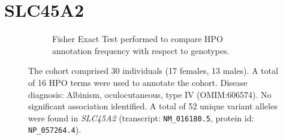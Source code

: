 \section*{SLC45A2}

\begin{figure}[htbp]
\centering
\begin{subfigure}[b]{0.95\textwidth}
\centering
{}
\captionsetup{justification=raggedright,singlelinecheck=false}
\caption{Fisher Exact Test performed to compare HPO annotation frequency with respect to genotypes. }
\end{subfigure}

\vspace{2em}

\caption{ The cohort comprised 30 individuals (17 females, 13 males). A total of 16 HPO terms were used to annotate the cohort. Disease diagnosis: Albinism, oculocutaneous, type IV (OMIM:606574). No significant association identified. A total of 52 unique variant alleles were found in \textit{SLC45A2} (transcript: \texttt{NM\_016180.5}, protein id: \texttt{NP\_057264.4}).}
\end{figure}

